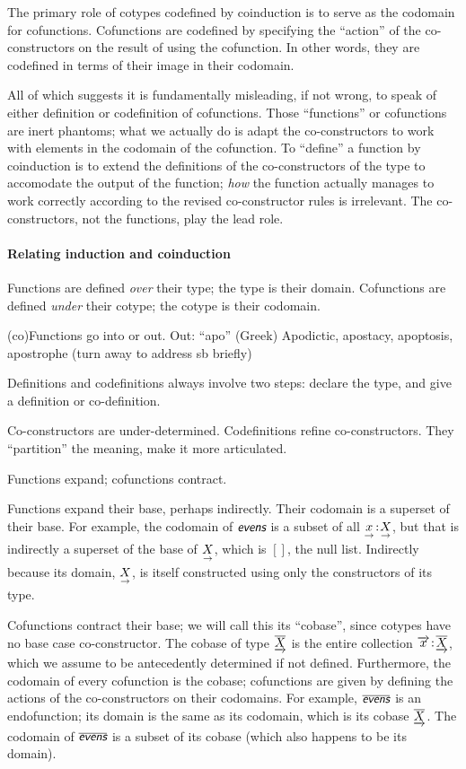 \documentclass{article}
\begin{document}
The primary role of cotypes codefined by coinduction is to serve as
the codomain for cofunctions. Cofunctions are codefined by specifying
the ``action'' of the co-constructors on the result of using the
cofunction. In other words, they are codefined in terms of their image
in their codomain.

All of which suggests it is fundamentally misleading, if not wrong, to
speak of either definition or codefinition of cofunctions. Those
``functions'' or cofunctions are inert phantoms; what we actually do
is adapt the co-constructors to work with elements in the codomain of
the cofunction. To ``define'' a function by coinduction is to extend
the definitions of the co-constructors of the type to accomodate the
output of the function; \textit{how} the function actually manages to
work correctly according to the revised co-constructor rules is
irrelevant. The co-constructors, not the functions, play the lead
role.

\paragraph{Relating induction and coinduction}

Functions are defined \textit{over} their type; the type is their
domain. Cofunctions are defined \textit{under} their cotype; the
cotype is their codomain.

(co)Functions go into or out. Out: ``apo'' (Greek) Apodictic,
apostacy, apoptosis, apostrophe (turn away to address sb briefly)

Definitions and codefinitions always involve two steps: declare the
type, and give a definition or co-definition.

Co-constructors are under-determined. Codefinitions refine
co-constructors. They ``partition'' the meaning, make it more
articulated.

Functions expand; cofunctions contract.

Functions expand their base, perhaps indirectly. Their codomain is a
superset of their base. For example, the codomain of \(\defn{evens}\)
is a subset of all \(\underset{\rightarrow}{x}\hspace{1pt}\mathpunct{:}\hspace{-1pt}\underset{\rightarrow}{X}\), but that is indirectly
a superset of the base of \(\underset{\rightarrow}{X}\), which is \([]\), the null
list. Indirectly because its domain, \(\underset{\rightarrow}{X}\), is itself
constructed using only the constructors of its type.

Cofunctions contract their base; we will call this its ``cobase'',
since cotypes have no base case co-constructor. The cobase of type
\(\underrightarrow{\overline{X}}\) is the entire collection
\(\overrightarrow{x}\hspace{1pt}\mathpunct{:}\hspace{-1pt}\underrightarrow{\overline{X}}\), which we assume to be antecedently
determined if not defined. Furthermore, the codomain of every
cofunction is the cobase; cofunctions are given by defining the
actions of the co-constructors on their codomains. For example,
\(\codefn{evens}\) is an endofunction; its domain is the same as its
codomain, which is its cobase \(\underrightarrow{\overline{X}}\). The codomain of
\(\codefn{evens}\) is a subset of its cobase (which also happens to be
its domain).
\end{document}
